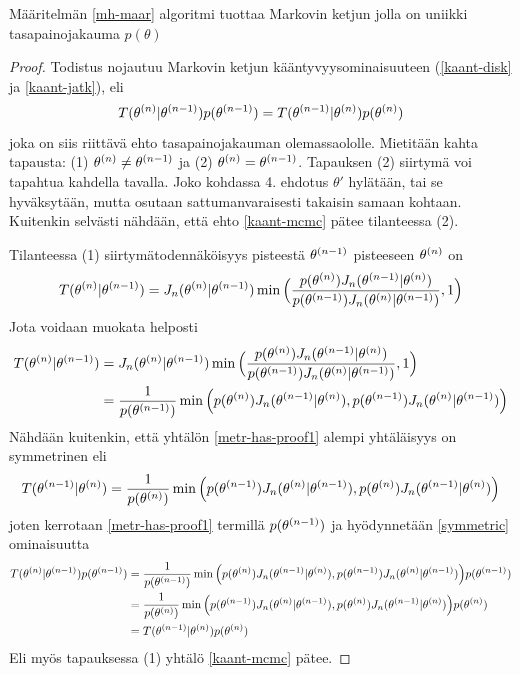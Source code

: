 \begin{lause}
	Määritelmän \ref{mh-maar} algoritmi tuottaa Markovin ketjun jolla on uniikki tasapainojakauma $p(\theta)$ 
\end{lause}

\begin{proof}

Todistus nojautuu Markovin ketjun kääntyvyysominaisuuteen (\ref{kaant-disk} ja \ref{kaant-jatk}), eli
	\begin{equation}\label{kaant-mcmc}
		T(\theta^{(n)}|\theta^{(n-1)})p(\theta^{(n-1)}) = T(\theta^{(n-1)}|\theta^{(n)})p(\theta^{(n)})
	\end{equation}
	joka on siis riittävä ehto tasapainojakauman olemassaololle. Mietitään kahta tapausta: (1) $\theta^{(n)} \neq \theta^{(n-1)}$ ja (2) $\theta^{(n)} = \theta^{(n-1)}$.
	Tapauksen (2) siirtymä voi tapahtua kahdella tavalla. Joko kohdassa 4. ehdotus $\theta'$ hylätään, tai se hyväksytään, mutta osutaan sattumanvaraisesti takaisin samaan kohtaan. Kuitenkin selvästi nähdään, että ehto \ref{kaant-mcmc} pätee tilanteessa (2).
	
	Tilanteessa (1) siirtymätodennäköisyys pisteestä $\theta^{(n-1)}$ pisteeseen $\theta^{(n)}$ on
	\begin{equation}
		T(\theta^{(n)}|\theta^{(n-1)}) = J_n(\theta^{(n)}|\theta^{(n-1)})
		\min\Big( \frac{p(\theta^{(n)})J_n(\theta^{(n-1)}|\theta^{(n)})}{p(\theta^{(n-1)})J_n(\theta^{(n)}|\theta^{(n-1)})},1 \Big)
	\end{equation}
	Jota voidaan muokata helposti
	\begin{equation}\label{metr-has-proof1}
		\begin{split}
			T(\theta^{(n)}|\theta^{(n-1)}) &= J_n(\theta^{(n)}|\theta^{(n-1)})
		\min\Big( \frac{p(\theta^{(n)})J_n(\theta^{(n-1)}|\theta^{(n)})}{p(\theta^{(n-1)})J_n(\theta^{(n)}|\theta^{(n-1)})},1 \Big) \\
		&= \frac{1}{p(\theta^{(n-1)})} \min \Big( p(\theta^{(n)})J_n(\theta^{(n-1)}|\theta^{(n)}) , p(\theta^{(n-1)})J_n(\theta^{(n)}|\theta^{(n-1)})  \Big)
		\end{split}
	\end{equation}
	Nähdään kuitenkin, että yhtälön \ref{metr-has-proof1} alempi yhtäläisyys on symmetrinen eli
	\begin{equation}\label{symmetric}
		T(\theta^{(n-1)}|\theta^{(n)})=\frac{1}{p(\theta^{(n)})} \min \Big( p(\theta^{(n-1)})J_n(\theta^{(n)}|\theta^{(n-1)}) , p(\theta^{(n)})J_n(\theta^{(n-1)}|\theta^{(n)})  \Big)
	\end{equation}
	joten kerrotaan \ref{metr-has-proof1} termillä $p(\theta^{(n-1)})$ ja hyödynnetään \ref{symmetric} ominaisuutta
	\begin{equation*}
	\begin{split}
		T(\theta^{(n)}|\theta^{(n-1)})p(\theta^{(n-1)}) &= \frac{1}{p(\theta^{(n-1)})} \min \Big( p(\theta^{(n)})J_n(\theta^{(n-1)}|\theta^{(n)}) , p(\theta^{(n-1)})J_n(\theta^{(n)}|\theta^{(n-1)})  \Big) p(\theta^{(n-1)}) \\
		&= \frac{1}{p(\theta^{(n)})} \min \Big( p(\theta^{(n-1)})J_n(\theta^{(n)}|\theta^{(n-1)}) , p(\theta^{(n)})J_n(\theta^{(n-1)}|\theta^{(n)})  \Big) p(\theta^{(n)}) \\
		&= T(\theta^{(n-1)}|\theta^{(n)})p(\theta^{(n)})
	\end{split}
	\end{equation*}
	Eli myös tapauksessa (1) yhtälö \ref{kaant-mcmc} pätee.
\end{proof}

